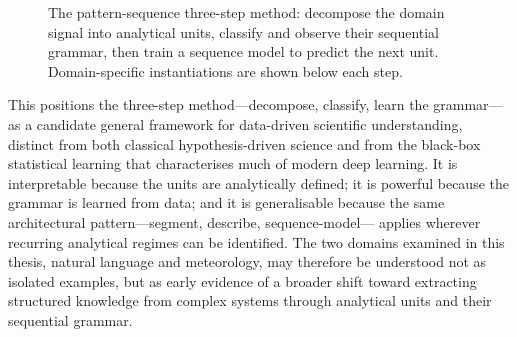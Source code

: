 \documentclass[12pt,a4paper,oneside]{report}
\begin{document}
\begin{figure}[H]
\centering
{}
\caption{The pattern-sequence three-step method: decompose the domain signal into analytical units, classify and observe their sequential grammar, then train a sequence model to predict the next unit. Domain-specific instantiations are shown below each step.}
\label{fig:threestep}
\end{figure}

This positions the three-step method---decompose, classify, learn the grammar---
as a candidate general framework for data-driven scientific understanding, distinct from
both classical hypothesis-driven science and from the black-box statistical learning that
characterises much of modern deep learning. It is interpretable because the units are
analytically defined; it is powerful because the grammar is learned from data; and it is
generalisable because the same architectural pattern---segment, describe, sequence-model---
applies wherever recurring analytical regimes can be identified. The two domains
examined in this thesis, natural language and meteorology, may therefore be understood not
as isolated examples, but as early evidence of a broader shift toward extracting structured
knowledge from complex systems through analytical units and their sequential grammar.
\end{document}

